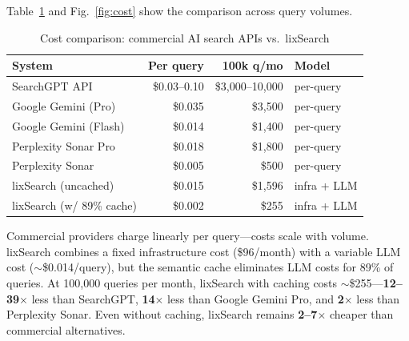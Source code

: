 \documentclass[conference]{IEEEtran}
\begin{document}
Table~\ref{tab:cost} and Fig.~\ref{fig:cost} show the comparison across query volumes.

\begin{table}[h]
\centering
\caption{Cost comparison: commercial AI search APIs vs.\ lixSearch}
\label{tab:cost}
{\scriptsize
\begin{tabular}{@{}lrrl@{}}
\toprule
\textbf{System} & \textbf{Per query} & \textbf{100k q/mo} & \textbf{Model} \\
\midrule
SearchGPT API & \$0.03--0.10 & \$3{,}000--10{,}000 & per-query \\
Google Gemini (Pro) & \$0.035 & \$3{,}500 & per-query \\
Google Gemini (Flash) & \$0.014 & \$1{,}400 & per-query \\
Perplexity Sonar Pro & \$0.018 & \$1{,}800 & per-query \\
Perplexity Sonar & \$0.005 & \$500 & per-query \\
\midrule
lixSearch (uncached) & \$0.015 & \$1{,}596 & infra + LLM \\
lixSearch (w/ 89\% cache) & \$0.002 & \$255 & infra + LLM \\
\bottomrule
\end{tabular}}
\end{table}

Commercial providers charge linearly per query---costs scale with volume. lixSearch combines a fixed infrastructure cost (\$96/month) with a variable LLM cost (${\sim}$\$0.014/query), but the semantic cache eliminates LLM costs for 89\% of queries. At 100{,}000 queries per month, lixSearch with caching costs ${\sim}$\$255---\textbf{12--39$\times$} less than SearchGPT, \textbf{14$\times$} less than Google Gemini Pro, and \textbf{2$\times$} less than Perplexity Sonar. Even without caching, lixSearch remains \textbf{2--7$\times$} cheaper than commercial alternatives.
\end{document}
